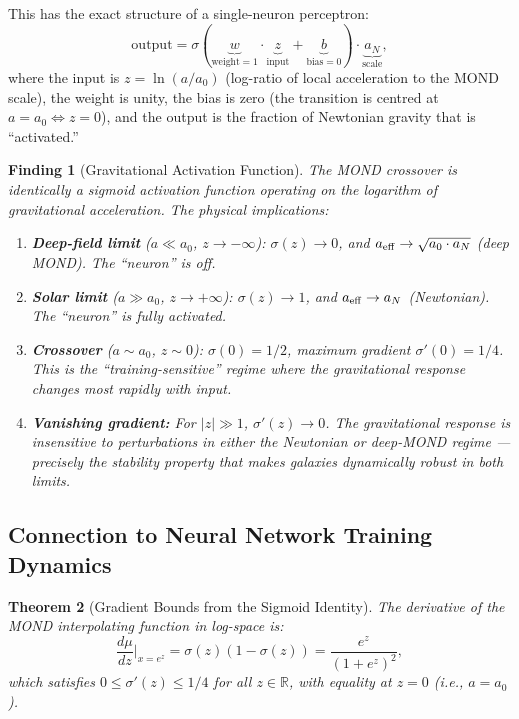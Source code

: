 \documentclass[11pt]{article}
\newtheorem{theorem}{Theorem}[section]
\newtheorem{finding}[theorem]{Finding}
\theoremstyle{definition}
\theoremstyle{remark}
\begin{document}
This has the exact structure of a single-neuron perceptron:
\begin{equation}
  \text{output} = \sigma(\underbrace{w}_{\text{weight}=1} \cdot
  \underbrace{z}_{\text{input}} + \underbrace{b}_{\text{bias}=0})
  \cdot \underbrace{a_N}_{\text{scale}},
  \label{eq:perceptron}
\end{equation}
where the input is $z = \ln(a/a_0)$ (log-ratio of local acceleration to
the MOND scale), the weight is unity, the bias is zero (the transition
is centred at $a = a_0 \Leftrightarrow z = 0$), and the output is the
fraction of Newtonian gravity that is ``activated.''

\begin{finding}[Gravitational Activation Function]
\label{find:grav-activation}
The MOND crossover is \emph{identically} a sigmoid activation function
operating on the logarithm of gravitational acceleration. The physical
implications:

\begin{enumerate}
\item \textbf{Deep-field limit} ($a \ll a_0$, $z \to -\infty$):
  $\sigma(z) \to 0$, and $a_{\rm eff} \to \sqrt{a_0 \cdot a_N}$
  (deep MOND). The ``neuron'' is off.

\item \textbf{Solar limit} ($a \gg a_0$, $z \to +\infty$):
  $\sigma(z) \to 1$, and $a_{\rm eff} \to a_N$ (Newtonian). The
  ``neuron'' is fully activated.

\item \textbf{Crossover} ($a \sim a_0$, $z \sim 0$):
  $\sigma(0) = 1/2$, maximum gradient $\sigma'(0) = 1/4$. This is
  the ``training-sensitive'' regime where the gravitational response
  changes most rapidly with input.

\item \textbf{Vanishing gradient:} For $|z| \gg 1$,
  $\sigma'(z) \to 0$. The gravitational response is insensitive to
  perturbations in either the Newtonian or deep-MOND regime ---
  precisely the stability property that makes galaxies dynamically
  robust in both limits.
\end{enumerate}
\end{finding}

\subsection{Connection to Neural Network Training Dynamics}
\label{sec:nn-training}

\begin{theorem}[Gradient Bounds from the Sigmoid Identity]
\label{thm:gradient-bounds}
The derivative of the MOND interpolating function in log-space is:
\begin{equation}
  \frac{d\mu}{dz}\bigg|_{x = e^z} = \sigma(z)(1 - \sigma(z))
  = \frac{e^z}{(1+e^z)^2},
  \label{eq:sigmoid-derivative}
\end{equation}
which satisfies $0 \leq \sigma'(z) \leq 1/4$ for all $z \in \mathbb{R}$,
with equality at $z = 0$ (i.e., $a = a_0$).
\end{theorem}
\end{document}
